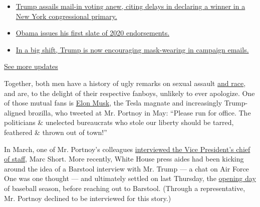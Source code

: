 \begin{itemize}
\tightlist
\item
  \href{https://www.nytimes.com/2020/08/03/us/elections/biden-vs-trump.html?action=click\&pgtype=Article\&state=default\&region=MAIN_CONTENT_1\&context=storylines_live_updates\#link-6494b448}{Trump
  assails mail-in voting anew, citing delays in declaring a winner in a
  New York congressional primary.}
\item
  \href{https://www.nytimes.com/2020/08/03/us/elections/biden-vs-trump.html?action=click\&pgtype=Article\&state=default\&region=MAIN_CONTENT_1\&context=storylines_live_updates\#link-3de249e6}{Obama
  issues his first slate of 2020 endorsements.}
\item
  \href{https://www.nytimes.com/2020/08/03/us/elections/biden-vs-trump.html?action=click\&pgtype=Article\&state=default\&region=MAIN_CONTENT_1\&context=storylines_live_updates\#link-54e34d20}{In
  a big shift, Trump is now encouraging mask-wearing in campaign
  emails.}
\end{itemize}

\href{https://www.nytimes.com/2020/08/03/us/elections/biden-vs-trump.html?action=click\&pgtype=Article\&state=default\&region=MAIN_CONTENT_1\&context=storylines_live_updates}{See
more updates}

Together, both men have a history of ugly remarks on sexual assault
\href{https://www.nydailynews.com/sports/football/ny-barstool-sports-portnoy-racism-20200706-6qoawvrjbnce5cygbknhlp2wwe-story.html}{and
race}, and are, to the delight of their respective fanboys, unlikely to
ever apologize. One of those mutual fans is
\href{https://www.nytimes.com/2020/07/25/style/elon-musk-maureen-dowd.html}{Elon
Musk}, the Tesla magnate and increasingly Trump-aligned brozilla, who
tweeted at Mr. Portnoy in May: ``Please run for office. The politicians
\& unelected bureaucrats who stole our liberty should be tarred,
feathered \& thrown out of town!''

In March, one of Mr. Portnoy's colleagues
\href{https://www.barstoolsports.com/video/2198855/riggs-visits-white-house-grounds-for-coronavirus-interview-with-vp-chief-of-staff-marc-short}{interviewed
the Vice President's chief of staff}, Marc Short. More recently, White
House press aides had been kicking around the idea of a Barstool
interview with Mr. Trump --- a chat on Air Force One was one thought ---
and ultimately settled on last Thursday, the
\href{https://www.nytimes.com/2020/07/29/sports/baseball/mlb-season-coronavirus.html}{opening
day} of baseball season, before reaching out to Barstool. (Through a
representative, Mr. Portnoy declined to be interviewed for this story.)

